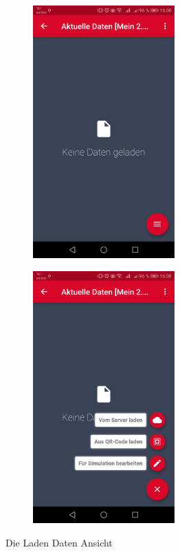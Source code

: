 	\begin{figure}[H]
	\begin{subfigure}[b]{0.5\textwidth}
	\centering
		\includegraphics[width=0.6\textwidth]{../include/images/funktionalitaet/dataLaden}
	\end{subfigure}
	\hfill
	\begin{subfigure}[b]{0.5\textwidth}
	\centering
		\includegraphics[width=0.6\textwidth]{../include/images/funktionalitaet/dataLaden_buttons}
	\end{subfigure}
	
	\caption{Die Laden Daten Ansicht}
\end{figure}


